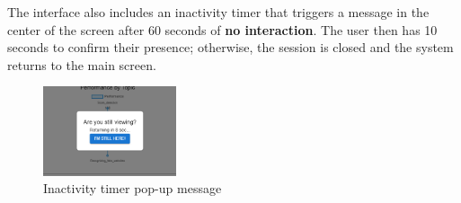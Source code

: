 The interface also includes an inactivity timer that triggers a message in the center of the screen after 60 seconds 
of \textbf{no interaction}. The user then has 10 seconds to confirm their presence; otherwise, the session is closed and the 
system returns to the main screen.

\begin{figure}[H]
    \centering
    \includegraphics[width=0.35\textwidth]{images/Grading1.png}
    \caption{Inactivity timer pop-up message}
\end{figure}